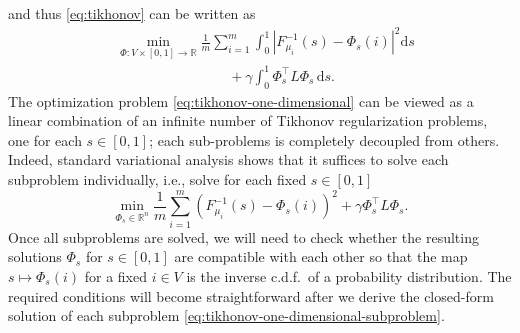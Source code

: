 \documentclass[letterpaper]{article} %
\begin{document}
and thus \eqref{eq:tikhonov} can be written as
\begin{equation}\label{eq:tikhonov-one-dimensional}
  \begin{aligned}
      &\min_{\Phi:V\times \left[ 0,1 \right]\rightarrow \mathbb{R}}\frac{1}{m}\sum_{i=1}^m\int_0^1 \left| F_{\mu_i}^{-1}\left( s \right)-\Phi_s \left( i \right) \right|^2\mathrm{d}s\\
      &\qquad \qquad\qquad \qquad +\gamma\int_0^1\Phi_s^{\top}L\Phi_s\,\mathrm{d}s.
  \end{aligned}
\end{equation}
The optimization problem \eqref{eq:tikhonov-one-dimensional} can be viewed as a linear combination of an infinite number of Tikhonov regularization problems, one for each $s\in \left[ 0,1 \right]$; each sub-problems is completely decoupled from others. Indeed, standard variational analysis shows that it suffices to solve each subproblem individually, i.e., solve for each fixed $s\in  \left[ 0,1 \right]$
\begin{equation}
  \label{eq:tikhonov-one-dimensional-subproblem}
  \min_{\Phi_s\in\mathbb{R}^n}\frac{1}{m}\sum_{i=1}^m \left( F_{\mu_i}^{-1}\left( s \right)-\Phi_s \left( i \right) \right)^2+\gamma \Phi_s^{\top}L\Phi_s.
\end{equation}
Once all subproblems are solved,  we will need to check whether the resulting solutions $\Phi_s$ for $s\in \left[ 0,1 \right]$ are compatible with each other so that the map $s\mapsto \Phi_s \left( i \right)$ for a fixed $i\in V$ is the inverse c.d.f.\ of a probability distribution. The required conditions will become straightforward after we derive the closed-form solution of each subproblem \eqref{eq:tikhonov-one-dimensional-subproblem}.
\end{document}
